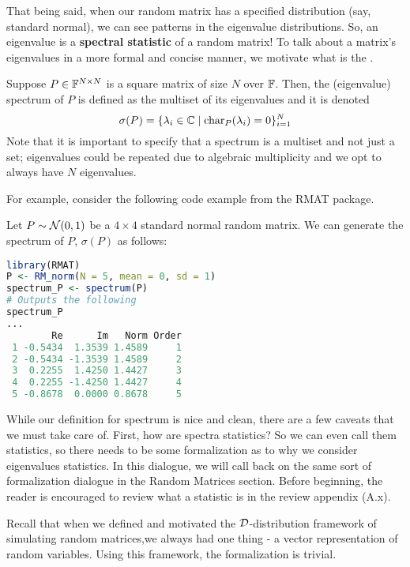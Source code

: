 That being said, when our random matrix has a specified distribution (say, standard normal), we can see patterns in the eigenvalue distributions. So, an eigenvalue is a \textbf{spectral statistic} of a random matrix! To talk about a matrix's eigenvalues in a more formal and concise manner, we motivate what is the .


\begin{definition}[Spectrum]
Suppose $P \in \mathbb{F}^{N \times N}$ is a square matrix of size $N$ over $\mathbb{F}$. Then, the (eigenvalue) spectrum of $P$ is defined as the multiset of its eigenvalues and it is denoted
$$\sigma(P) = \{\lambda_i \in \mathbb{C} \mid \text{char}_P(\lambda_i) = 0 \}_{i=1}^N$$
Note that it is important to specify that a spectrum is a multiset and not just a set; eigenvalues could be repeated due to algebraic multiplicity and we opt to always have $N$ eigenvalues.
\end{definition}

\medskip
\noindent For example, consider the following code example from the RMAT package.
\begin{code}
Let $P \sim \mathcal{N}(0,1)$ be a $4 \times 4$ standard normal random matrix. We can generate the spectrum of $P$, $\sigma(P)$ as follows:
\end{code}

\begin{lstlisting}[language=R]
library(RMAT)
P <- RM_norm(N = 5, mean = 0, sd = 1)
spectrum_P <- spectrum(P)
# Outputs the following
spectrum_P
...
        Re      Im   Norm Order
 1 -0.5434  1.3539 1.4589     1
 2 -0.5434 -1.3539 1.4589     2
 3  0.2255  1.4250 1.4427     3
 4  0.2255 -1.4250 1.4427     4
 5 -0.8678  0.0000 0.8678     5
\end{lstlisting}

While our definition for spectrum is nice and clean, there are a few caveats that we must take care of. First, how are spectra statistics? So we can even call them statistics, so there needs to be some formalization as to why we consider eigenvalues statistics. In this dialogue, we will call back on the same sort of formalization dialogue in the Random Matrices section. Before beginning, the reader is encouraged to review what a statistic is in the review appendix (A.x).

Recall that when we defined and motivated the $\mathcal{D}$-distribution framework of simulating random matrices,we always had one thing - a vector representation of random variables. Using this framework, the formalization is trivial.

